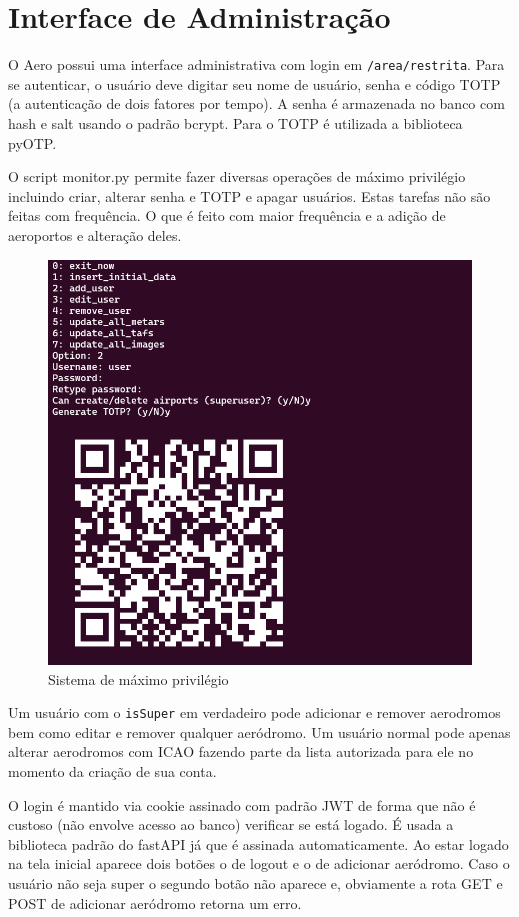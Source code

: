 \chapter{Interface de Administração}

O Aero possui uma interface administrativa com login em \verb|/area/restrita|. 
Para se autenticar,
o usuário deve digitar seu nome de usuário, senha e código TOTP (a autenticação
de dois fatores por tempo). A senha é armazenada no banco com hash e salt usando 
o padrão bcrypt. Para o TOTP é utilizada a biblioteca pyOTP. 

O script monitor.py permite fazer diversas operações de máximo privilégio 
incluindo criar, alterar senha e TOTP e apagar usuários. Estas tarefas não são 
feitas com frequência. O que é feito com maior frequência e a adição de aeroportos 
e alteração deles.

\begin{figure}[ht]
    \begin{center}
    \includegraphics[width=0.8\linewidth]{img/create-user-script.png}
    \caption{Sistema de máximo privilégio}
    \label{fig:max-priv-sys}
    \end{center}
\end{figure}

Um usuário com o \verb|isSuper| em verdadeiro pode adicionar e remover aerodromos 
bem como editar e remover qualquer aeródromo. Um usuário normal pode apenas alterar 
aerodromos com ICAO fazendo parte da lista autorizada para ele no momento da criação
de sua conta.

O login é mantido via cookie assinado com padrão JWT de forma que não é custoso 
(não envolve acesso ao banco) verificar se está logado. É usada a biblioteca padrão 
do fastAPI já que é assinada automaticamente.
Ao estar logado na tela inicial aparece dois botões o de logout e o de adicionar 
aeródromo. Caso o usuário não seja super o segundo botão não aparece e, obviamente 
a rota GET e POST de adicionar aeródromo retorna um erro.

